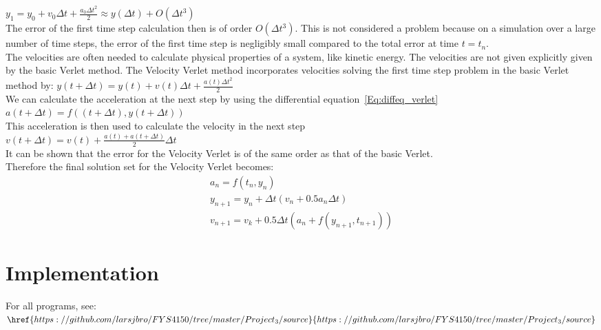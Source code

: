 $y_1 = y_0 +v_0\Delta t + \frac{a_0\Delta t^2}{2}\approx y(\Delta t)+O(\Delta t^3)$\\

The error of the first time step calculation then is of order $O(\Delta t^3)$. This is not considered a problem because on a simulation over a large number of time steps, the error of the first time step is negligibly small compared to the total error at time $t=t_n$.\\


The velocities are often needed to calculate physical properties of a system, like kinetic energy. The velocities are not given explicitly given by the basic Verlet method. The Velocity Verlet method incorporates velocities solving the first time step problem in the basic Verlet method by:
$y(t+\Delta t) = y(t) +v(t)\Delta t + \frac{a(t)\Delta t^2}{2}$\\

We can calculate the acceleration at the next step by using the differential equation~\ref{Eq:diffeq_verlet}\\

$a(t+\Delta t) = f((t+\Delta t), y(t+\Delta t))$\\

This acceleration is then used to calculate the velocity in the next step\\

$v(t+\Delta t) = v(t) +\frac{a(t)+a(t+\Delta t)}{2}\Delta t$\\

It can be shown that the error for the Velocity Verlet is of the same order as that of the basic Verlet. \\

Therefore the final solution set for the Velocity Verlet becomes:\\
\begin{gather}
		a_n = f(t_n, y_n)\\
        y_{n+1} = y_n + \Delta t (v_n + 0.5 a_n \Delta t) \\
        v_{n+1} = v_k + 0.5 \Delta t (a_n + f(y_{n+1}, t_{n+1}))
\end{gather}


\newpage
\section{Implementation}
For all programs, see:\\
$\href{https://github.com/larsjbro/FYS4150/tree/master/Project_3/source}{https://github.com/larsjbro/FYS4150/tree/master/Project_3/source}$
